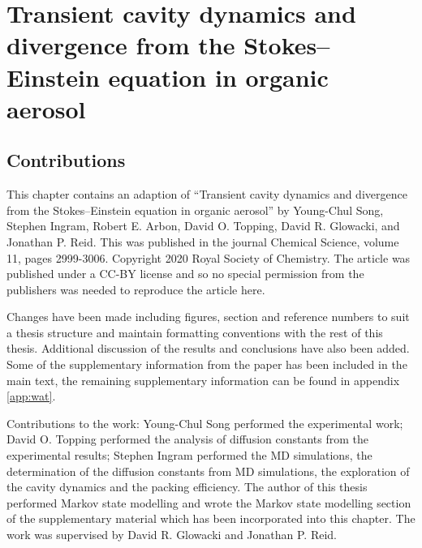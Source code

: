 %
%
\let\textcircled=\pgftextcircled
\chapter{Transient cavity dynamics and divergence from the Stokes–Einstein equation in organic aerosol}
\label{chap:water}


\section*{Contributions}

This chapter contains an adaption of ``Transient cavity dynamics and divergence from the Stokes–Einstein equation in organic aerosol'' by Young-Chul Song, Stephen Ingram, Robert E. Arbon, David O. Topping, David R. Glowacki, and Jonathan P. Reid. This was published in the journal Chemical Science, volume 11, pages 2999-3006. Copyright 2020 Royal Society of Chemistry. The article was published under a CC-BY license and so no special permission from the publishers was needed to reproduce the article here. 

Changes have been made including figures, section and reference numbers to suit a thesis structure and maintain formatting conventions with the rest of this thesis. Additional discussion of the results and conclusions have also been added. Some of the supplementary information from the paper has  been included in the main text, the remaining supplementary information can be found in appendix \ref{app:wat}. 

Contributions to the work: Young-Chul Song performed the experimental work; David O. Topping performed the analysis of diffusion constants from the experimental results; Stephen Ingram performed the MD simulations, the determination of the diffusion constants from MD simulations, the exploration of the cavity dynamics and the packing efficiency. The author of this thesis performed Markov state modelling and wrote the Markov state modelling section of the supplementary material which has been incorporated into this chapter. The work was supervised by David R. Glowacki and Jonathan P. Reid. 

